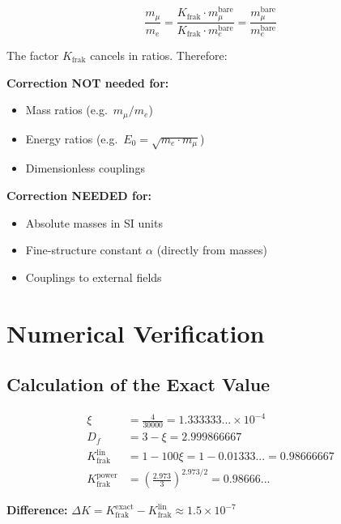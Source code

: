 	\begin{equation}
		\frac{m_\mu}{m_e} = \frac{K_{\text{frak}} \cdot m_\mu^{\text{bare}}}{K_{\text{frak}} \cdot m_e^{\text{bare}}} = \frac{m_\mu^{\text{bare}}}{m_e^{\text{bare}}}
		\label{eq:ratio_correction_free_en}
	\end{equation}
	
	The factor $K_{\text{frak}}$ cancels in ratios. Therefore:
	
	\begin{tcolorbox}[colback=green!5!white,colframe=green!75!black,title={When is $K_{\text{frak}}$ needed?}]
		\textbf{Correction NOT needed for:}
		\begin{itemize}
			\item Mass ratios (e.g.\ $m_\mu/m_e$)
			\item Energy ratios (e.g.\ $E_0 = \sqrt{m_e \cdot m_\mu}$)
			\item Dimensionless couplings
		\end{itemize}
		
		\textbf{Correction NEEDED for:}
		\begin{itemize}
			\item Absolute masses in SI units
			\item Fine-structure constant $\alpha$ (directly from masses)
			\item Couplings to external fields
		\end{itemize}
	\end{tcolorbox}
	
	\section{Numerical Verification}
	
	\subsection{Calculation of the Exact Value}
	
	\begin{align}
		\xi &= \frac{4}{30000} = 1.333333... \times 10^{-4} \\
		D_f &= 3 - \xi = 2.999866667 \\
		K_{\text{frak}}^{\text{lin}} &= 1 - 100\xi = 1 - 0.01333... = 0.98666667 \\
		K_{\text{frak}}^{\text{power}} &= \left(\frac{2.973}{3}\right)^{2.973/2} = 0.98666...
	\end{align}
	
	\textbf{Difference:} $\Delta K = K_{\text{frak}}^{\text{exact}} - K_{\text{frak}}^{\text{lin}} \approx 1.5 \times 10^{-7}$
	
